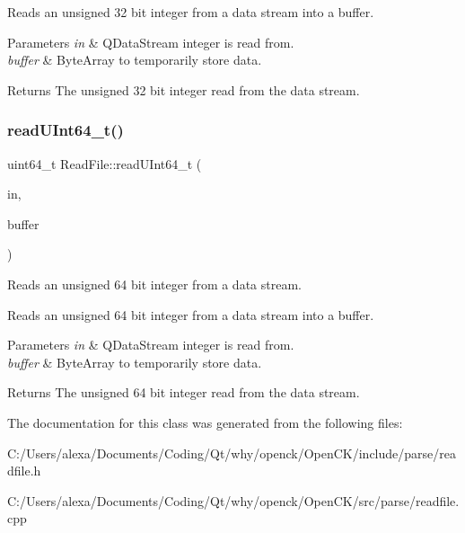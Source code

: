 Reads an unsigned 32 bit integer from a data stream into a buffer. 
\begin{DoxyParams}{Parameters}
{\em in} & Q\+Data\+Stream integer is read from. \\
\hline
{\em buffer} & Byte\+Array to temporarily store data. \\
\hline
\end{DoxyParams}
\begin{DoxyReturn}{Returns}
The unsigned 32 bit integer read from the data stream. 
\end{DoxyReturn}
\mbox{\label{class_read_file_a169f01731ca710d2ea946bb92e1ce176}} 
\subsubsection{\texorpdfstring{read\+U\+Int64\+\_\+t()}{readUInt64\_t()}}
{\footnotesize\ttfamily uint64\+\_\+t Read\+File\+::read\+U\+Int64\+\_\+t (\begin{DoxyParamCaption}\item[{Q\+Data\+Stream $\ast$}]{in,  }\item[{Q\+Byte\+Array $\ast$}]{buffer }\end{DoxyParamCaption})\hspace{0.3cm}{\ttfamily [static]}}



Reads an unsigned 64 bit integer from a data stream. 

Reads an unsigned 64 bit integer from a data stream into a buffer. 
\begin{DoxyParams}{Parameters}
{\em in} & Q\+Data\+Stream integer is read from. \\
\hline
{\em buffer} & Byte\+Array to temporarily store data. \\
\hline
\end{DoxyParams}
\begin{DoxyReturn}{Returns}
The unsigned 64 bit integer read from the data stream. 
\end{DoxyReturn}


The documentation for this class was generated from the following files\+:\begin{DoxyCompactItemize}
\item 
C\+:/\+Users/alexa/\+Documents/\+Coding/\+Qt/why/openck/\+Open\+C\+K/include/parse/readfile.\+h\item 
C\+:/\+Users/alexa/\+Documents/\+Coding/\+Qt/why/openck/\+Open\+C\+K/src/parse/readfile.\+cpp\end{DoxyCompactItemize}
